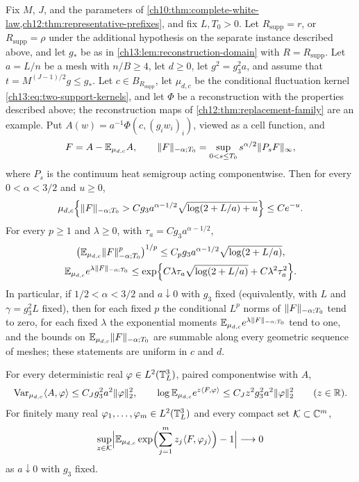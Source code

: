 \begin{theorem}\label{ch13:thm:centered-shell}
Fix $M$, $J$, and the parameters of \cref{ch10:thm:complete-white-law,ch12:thm:representative-prefixes}, and fix $L,T_0>0$. Let $R_{\mathrm{supp}}=r$, or $R_{\mathrm{supp}}=\rho$ under the additional hypothesis on the separate instance described above, and let $g_*$ be as in \cref{ch13:lem:reconstruction-domain} with $R=R_{\mathrm{supp}}$. Let $a=L/n$ be a mesh with $n/B\ge4$, let $d\ge0$, let $g^2=g_3^2a$, and assume that $t=M^{(J-1)/2}g\le g_*$. Let $c\in B_{R_{\mathrm{supp}}}$, let $\mu_{d,c}$ be the conditional fluctuation kernel \eqref{ch13:eq:two-support-kernels}, and let $\Phi$ be a reconstruction with the properties described above; the reconstruction maps of \cref{ch12:thm:replacement-family} are an example. Put $A(w)=a^{-1}\Phi(c,(g_iw_i)_i)$, viewed as a cell function, and
\[
 F=A-\mathbb E_{\mu_{d,c}}A,\qquad\lVert F\rVert_{-\alpha;T_0}=\sup_{0<s\le T_0}s^{\alpha/2}\lVert P_sF\rVert_\infty,
\]
where $P_s$ is the continuum heat semigroup acting componentwise. Then for every $0<\alpha<3/2$ and $u\ge0$,
\[
 \mu_{d,c}\Bigl\{\lVert F\rVert_{-\alpha;T_0}>Cg_3a^{\alpha-1/2}\sqrt{\log(2+L/a)+u}\Bigr\}\le Ce^{-u}.
\]
For every $p\ge1$ and $\lambda\ge0$, with $\tau_a=Cg_3a^{\alpha-1/2}$,
\[
 \begin{gathered}
 \bigl(\mathbb E_{\mu_{d,c}}\lVert F\rVert_{-\alpha;T_0}^p\bigr)^{1/p}\le C_pg_3a^{\alpha-1/2}\sqrt{\log(2+L/a)},\\
 \mathbb E_{\mu_{d,c}}e^{\lambda\lVert F\rVert_{-\alpha;T_0}}\le\exp\Bigl\{C\lambda\tau_a\sqrt{\log(2+L/a)}+C\lambda^2\tau_a^2\Bigr\}.
 \end{gathered}
\]
In particular, if $1/2<\alpha<3/2$ and $a\downarrow0$ with $g_3$ fixed (equivalently, with $L$ and $\gamma=g_3^2L$ fixed), then for each fixed $p$ the conditional $L^p$ norms of $\lVert F\rVert_{-\alpha;T_0}$ tend to zero, for each fixed $\lambda$ the exponential moments $\mathbb E_{\mu_{d,c}}e^{\lambda\lVert F\rVert_{-\alpha;T_0}}$ tend to one, and the bounds on $\mathbb E_{\mu_{d,c}}\lVert F\rVert_{-\alpha;T_0}$ are summable along every geometric sequence of meshes; these statements are uniform in $c$ and $d$.

For every deterministic real $\varphi\in L^2(\mathbb T_L^3)$, paired componentwise with $A$,
\[
 \operatorname{Var}_{\mu_{d,c}}\langle A,\varphi\rangle\le C_Jg_3^2a^2\lVert \varphi\rVert_2^2,\qquad
 \log\mathbb E_{\mu_{d,c}}e^{z\langle F,\varphi\rangle}\le C_Jz^2g_3^2a^2\lVert \varphi\rVert_2^2\qquad(z\in\mathbb R).
\]
For finitely many real $\varphi_1,\dots,\varphi_m\in L^2(\mathbb T_L^3)$ and every compact set $\mathcal K\subset\mathbb C^m$,
\[
 \sup_{z\in\mathcal K}\Bigl\lvert\mathbb E_{\mu_{d,c}}\exp\Bigl(\sum_{j=1}^mz_j\langle F,\varphi_j\rangle\Bigr)-1\Bigr\rvert\longrightarrow0
\]
as $a\downarrow0$ with $g_3$ fixed.


\end{theorem}
